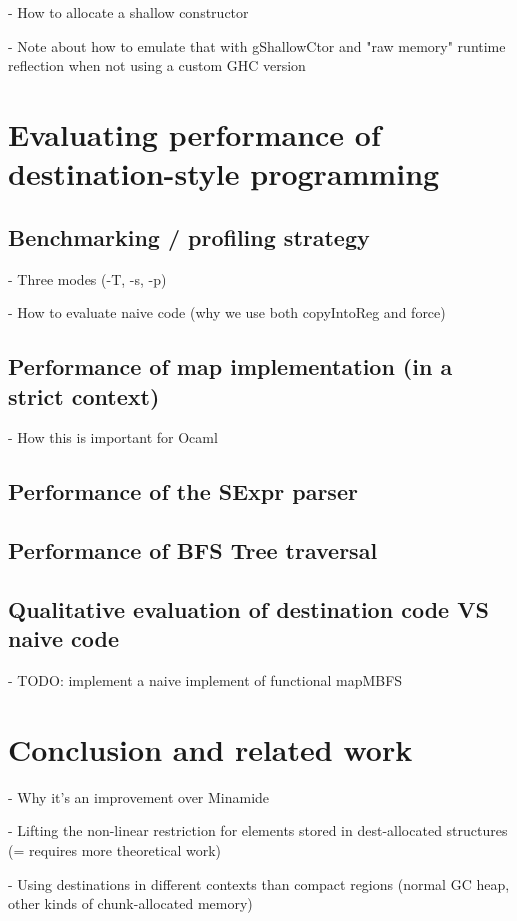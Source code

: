 \documentclass[english]{jflart}
\begin{document}
- How to allocate a shallow constructor

- Note about how to emulate that with gShallowCtor and "raw memory" runtime reflection when not using a custom GHC version

\section{Evaluating performance of destination-style programming}

\subsection{Benchmarking / profiling strategy}

- Three modes (-T, -s, -p)

- How to evaluate naive code (why we use both copyIntoReg and force)

\subsection{Performance of map implementation (in a strict context)}

- How this is important for Ocaml

\subsection{Performance of the SExpr parser}

\subsection{Performance of BFS Tree traversal}

\subsection{Qualitative evaluation of destination code VS naive code}

- TODO: implement a naive implement of functional mapMBFS

\section{Conclusion and related work}

- Why it's an improvement over Minamide

- Lifting the non-linear restriction for elements stored in dest-allocated structures (= requires more theoretical work)

- Using destinations in different contexts than compact regions (normal GC heap, other kinds of chunk-allocated memory)

\printbibliography
\end{document}
